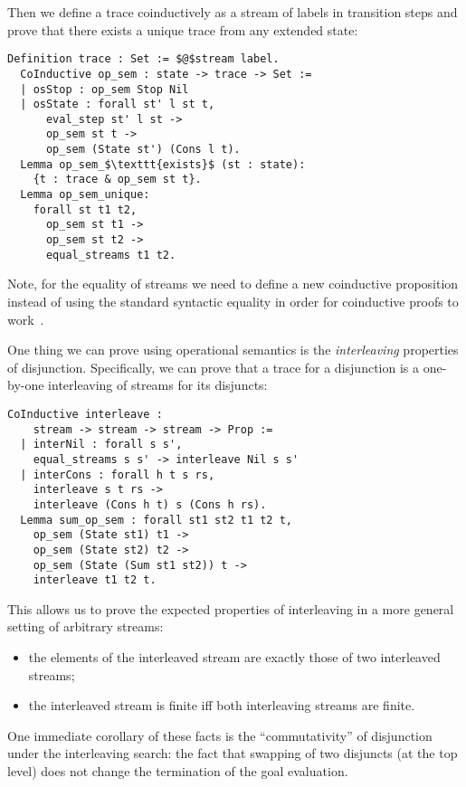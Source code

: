 Then we define a trace coinductively as a stream of labels in transition steps and prove that there exists a unique trace from any extended state:

\begin{lstlisting}[language=Coq]
  Definition trace : Set := $@$stream label.
  CoInductive op_sem : state -> trace -> Set :=
  | osStop : op_sem Stop Nil
  | osState : forall st' l st t,
      eval_step st' l st ->
      op_sem st t ->
      op_sem (State st') (Cons l t).
  Lemma op_sem_$\texttt{exists}$ (st : state):
    {t : trace & op_sem st t}.
  Lemma op_sem_unique:
    forall st t1 t2,
      op_sem st t1 ->
      op_sem st t2 ->
      equal_streams t1 t2.
\end{lstlisting}

Note, for the equality of streams we need to define a new coinductive proposition instead of using the standard syntactic equality in order for coinductive proofs to work~\cite{CPDT}.

One thing we can prove using operational semantics is the \emph{interleaving} properties of disjunction. Specifically, we can prove that a trace for a disjunction is
a one-by-one interleaving of streams for its disjuncts:

\begin{lstlisting}[language=Coq]
  CoInductive interleave :
    stream -> stream -> stream -> Prop :=
  | interNil : forall s s',
    equal_streams s s' -> interleave Nil s s'
  | interCons : forall h t s rs,
    interleave s t rs ->
    interleave (Cons h t) s (Cons h rs).
  Lemma sum_op_sem : forall st1 st2 t1 t2 t,
    op_sem (State st1) t1 ->
    op_sem (State st2) t2 ->
    op_sem (State (Sum st1 st2)) t ->
    interleave t1 t2 t.
\end{lstlisting}

This allows us to prove the expected properties of interleaving in a more general setting of arbitrary streams:

\begin{itemize}
\item the elements of the interleaved stream are exactly those of two interleaved streams;
\item the interleaved stream is finite iff both interleaving streams are finite.
\end{itemize}

\begin{comment}
The corresponding \textsc{Coq} lemmas are as follows:

\begin{lstlisting}[language=Coq]
  Lemma interleave_in : forall s1 s2 s,
    interleave s1 s2 s ->
    forall x, in_stream x s <-> in_stream x s1 \/ in_stream x s2.
  Lemma interleave_finite : forall s1 s2 s,
    interleave s1 s2 s ->
    (finite s <-> finite s1 /\ finite s2).
\end{lstlisting}
\end{comment}

One immediate corollary of these facts is the ``commutativity'' of disjunction under the interleaving search: the fact that swapping of two disjuncts (at the top level) does not change the termination of the goal evaluation.
